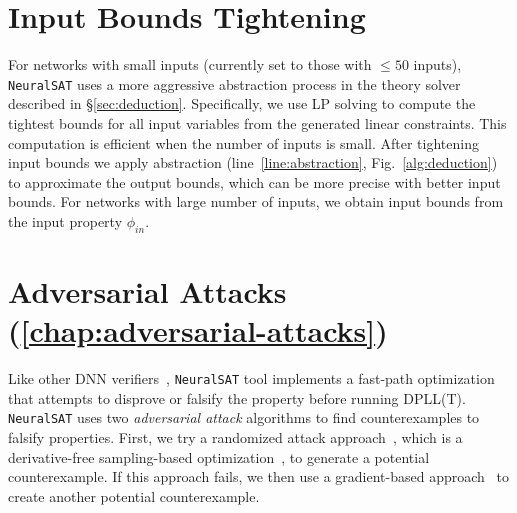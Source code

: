 \documentclass[oneside,11pt,dvipsnames]{book}
\numberwithin{equation}{section}
\theoremstyle{definition}
\theoremstyle{remark}
\newcommand{\ignore}[1]{}
\newcommand{\tool}{\texttt{NeuralSAT}}
\begin{document}
\section{Input Bounds Tightening}\label{sec:inputboundstigthten}
For networks with small inputs (currently set to those with $\le 50$ inputs), \tool{} uses a more aggressive abstraction process in the theory solver described in \S\ref{sec:deduction}. Specifically,  we use LP solving to compute the tightest bounds for all input variables from the generated linear constraints. This computation is efficient when the number of inputs is small.
After tightening input bounds we apply abstraction (line~\ref{line:abstraction}, Fig.~\ref{alg:deduction}) to approximate the output bounds, which can be more precise with better input bounds.
For networks with large number of inputs, we obtain input bounds from the input property $\phi_{in}$.
\ignore{
\subsection{Decision Heuristics}\label{sec:decision-heuristics}
Decision or branching heuristics decide free variables to make assignments and thus are crucial for the scalability of DPLL by reducing assignment mistakes~\cite{kroening2016decision,beyer2022progress}.

For networks with small inputs, \tool{} prioritizes variables representing neurons with the \emph{furthest bounds} from the decision value 0 of ReLU, i.e., the 0 in $\max(x,0)$.
Such neurons have wider bounds and therefore are more difficult to tighten during abstraction compared to other neurons.
This heuristic helps input bounds tightening as described in \S\ref{sec:inputboundstigthten} (which is also applied only for networks with small inputs). It is also cheap because we can reuse the computed boundaries of hidden neurons during abstraction.
}


\section{Adversarial Attacks (\autoref{chap:adversarial-attacks})} Like other DNN verifiers~\cite{ferrari2022complete,zhang2022general}, \tool{} tool implements a fast-path optimization that attempts to disprove or falsify the property before running DPLL(T).
\tool{} uses two \emph{adversarial attack} algorithms to find counterexamples to falsify properties.
First, we try a randomized attack approach~\cite{das2021fast}, which is a derivative-free sampling-based optimization~\cite{yu2016derivative}, to generate a potential counterexample.
If this approach fails, we then use a gradient-based approach~\cite{madry2017towards} to create another potential counterexample.
\end{document}
